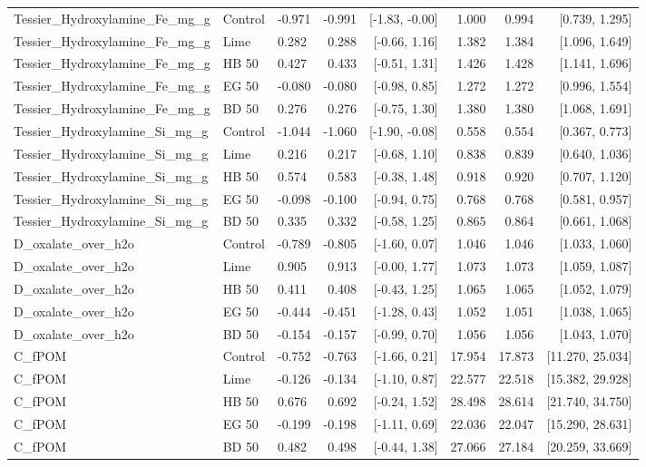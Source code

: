 \documentclass[preprint,12pt]{elsarticle}
\begin{document}
\begin{landscape}
\begin{longtable}{lllrrrrr}
Tessier\_Hydroxylamine\_Fe\_mg\_g & Control & -0.971 & -0.991 & [-1.83, -0.00] & 1.000 & 0.994 & [0.739, 1.295] \\
Tessier\_Hydroxylamine\_Fe\_mg\_g & Lime & 0.282 & 0.288 & [-0.66, 1.16] & 1.382 & 1.384 & [1.096, 1.649] \\
Tessier\_Hydroxylamine\_Fe\_mg\_g & HB 50 & 0.427 & 0.433 & [-0.51, 1.31] & 1.426 & 1.428 & [1.141, 1.696] \\
Tessier\_Hydroxylamine\_Fe\_mg\_g & EG 50 & -0.080 & -0.080 & [-0.98, 0.85] & 1.272 & 1.272 & [0.996, 1.554] \\
Tessier\_Hydroxylamine\_Fe\_mg\_g & BD 50 & 0.276 & 0.276 & [-0.75, 1.30] & 1.380 & 1.380 & [1.068, 1.691] \\
Tessier\_Hydroxylamine\_Si\_mg\_g & Control & -1.044 & -1.060 & [-1.90, -0.08] & 0.558 & 0.554 & [0.367, 0.773] \\
Tessier\_Hydroxylamine\_Si\_mg\_g & Lime & 0.216 & 0.217 & [-0.68, 1.10] & 0.838 & 0.839 & [0.640, 1.036] \\
Tessier\_Hydroxylamine\_Si\_mg\_g & HB 50 & 0.574 & 0.583 & [-0.38, 1.48] & 0.918 & 0.920 & [0.707, 1.120] \\
Tessier\_Hydroxylamine\_Si\_mg\_g & EG 50 & -0.098 & -0.100 & [-0.94, 0.75] & 0.768 & 0.768 & [0.581, 0.957] \\
Tessier\_Hydroxylamine\_Si\_mg\_g & BD 50 & 0.335 & 0.332 & [-0.58, 1.25] & 0.865 & 0.864 & [0.661, 1.068] \\
D\_oxalate\_over\_h2o & Control & -0.789 & -0.805 & [-1.60, 0.07] & 1.046 & 1.046 & [1.033, 1.060] \\
D\_oxalate\_over\_h2o & Lime & 0.905 & 0.913 & [-0.00, 1.77] & 1.073 & 1.073 & [1.059, 1.087] \\
D\_oxalate\_over\_h2o & HB 50 & 0.411 & 0.408 & [-0.43, 1.25] & 1.065 & 1.065 & [1.052, 1.079] \\
D\_oxalate\_over\_h2o & EG 50 & -0.444 & -0.451 & [-1.28, 0.43] & 1.052 & 1.051 & [1.038, 1.065] \\
D\_oxalate\_over\_h2o & BD 50 & -0.154 & -0.157 & [-0.99, 0.70] & 1.056 & 1.056 & [1.043, 1.070] \\
C\_fPOM & Control & -0.752 & -0.763 & [-1.66, 0.21] & 17.954 & 17.873 & [11.270, 25.034] \\
C\_fPOM & Lime & -0.126 & -0.134 & [-1.10, 0.87] & 22.577 & 22.518 & [15.382, 29.928] \\
C\_fPOM & HB 50 & 0.676 & 0.692 & [-0.24, 1.52] & 28.498 & 28.614 & [21.740, 34.750] \\
C\_fPOM & EG 50 & -0.199 & -0.198 & [-1.11, 0.69] & 22.036 & 22.047 & [15.290, 28.631] \\
C\_fPOM & BD 50 & 0.482 & 0.498 & [-0.44, 1.38] & 27.066 & 27.184 & [20.259, 33.669] \\
\end{longtable}


\end{landscape}
\end{document}
